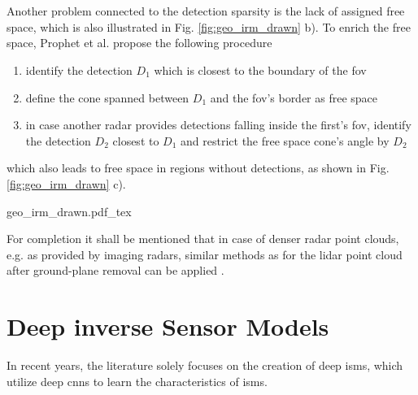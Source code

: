 \\\\
Another problem connected to the detection sparsity is the lack of assigned free space, which is also illustrated in Fig. \ref{fig:geo_irm_drawn} b). To enrich the free space, Prophet et al. \cite{prophet2018adaptions} propose the following procedure
\begin{enumerate}[noitemsep,nolistsep,topsep=0pt]
	\item identify the detection $D_1$ which is closest to the boundary of the \gls{fov}
	\item define the cone spanned between $D_1$ and the \gls{fov}'s border as free space
	\item in case another radar provides detections falling inside the first's \gls{fov}, identify the detection $D_2$ closest to $D_1$ and restrict the free space cone's angle by $D_2$   
\end{enumerate}
which also leads to free space in regions without detections, as shown in Fig. \ref{fig:geo_irm_drawn} c).
\begin{center}
	{geo_irm_drawn.pdf_tex}
\end{center}
For completion it shall be mentioned that in case of denser radar point clouds, e.g. as provided by imaging radars, similar methods as for the lidar point cloud after ground-plane removal can be applied \cite{slutsky2019dual}.
%
\section{Deep inverse Sensor Models}
\label{sec:deep_isms}
In recent years, the literature solely focuses on the creation of deep \gls{ism}s, which utilize deep \gls{cnn}s to learn the characteristics of \gls{ism}s. 
%
